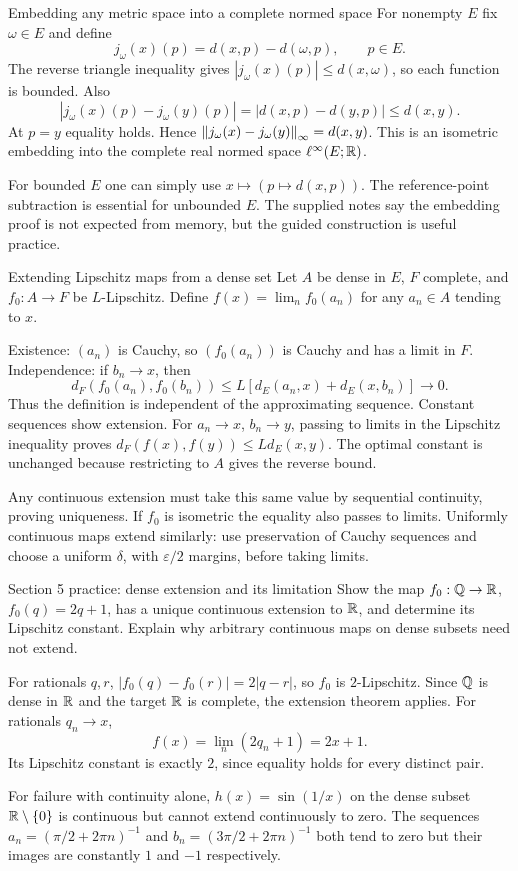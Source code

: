 \begin{note}{Embedding any metric space into a complete normed space}
For nonempty $E$ fix $\omega\in E$ and define
\[j_\omega(x)(p)=d(x,p)-d(\omega,p),\qquad p\in E.\]
The reverse triangle inequality gives $|j_\omega(x)(p)|\le d(x,\omega)$, so each function is bounded. Also
\[|j_\omega(x)(p)-j_\omega(y)(p)|=|d(x,p)-d(y,p)|\le d(x,y).\]
At $p=y$ equality holds. Hence $\left\lVert j_\omega(x)-j_\omega(y)\right\rVert_\infty=d(x,y)$. This is an isometric embedding into the complete real normed space $\ell^\infty(E;\mathbb R)$.

For bounded $E$ one can simply use $x\mapsto(p\mapsto d(x,p))$. The reference-point subtraction is essential for unbounded $E$. The supplied notes say the embedding proof is not expected from memory, but the guided construction is useful practice.
\end{note}
\begin{note}{Extending Lipschitz maps from a dense set}
Let $A$ be dense in $E$, $F$ complete, and $f_0:A\to F$ be $L$-Lipschitz. Define $f(x)=\lim_n f_0(a_n)$ for any $a_n\in A$ tending to $x$.

Existence: $(a_n)$ is Cauchy, so $(f_0(a_n))$ is Cauchy and has a limit in $F$. Independence: if $b_n\to x$, then
\[d_F(f_0(a_n),f_0(b_n))\le L[d_E(a_n,x)+d_E(x,b_n)]\to0.\]
Thus the definition is independent of the approximating sequence. Constant sequences show extension. For $a_n\to x$, $b_n\to y$, passing to limits in the Lipschitz inequality proves $d_F(f(x),f(y))\le Ld_E(x,y)$. The optimal constant is unchanged because restricting to $A$ gives the reverse bound.

Any continuous extension must take this same value by sequential continuity, proving uniqueness. If $f_0$ is isometric the equality also passes to limits. Uniformly continuous maps extend similarly: use preservation of Cauchy sequences and choose a uniform $\delta$, with $\varepsilon/2$ margins, before taking limits.
\end{note}
\begin{exam}{Section 5 practice: dense extension and its limitation}
Show the map $f_0:\mathbb Q\to\mathbb R$, $f_0(q)=2q+1$, has a unique continuous extension to $\mathbb R$, and determine its Lipschitz constant. Explain why arbitrary continuous maps on dense subsets need not extend.
\end{exam}
\begin{answer}
For rationals $q,r$, $|f_0(q)-f_0(r)|=2|q-r|$, so $f_0$ is $2$-Lipschitz. Since $\mathbb Q$ is dense in $\mathbb R$ and the target $\mathbb R$ is complete, the extension theorem applies. For rationals $q_n\to x$,
\[f(x)=\lim_n(2q_n+1)=2x+1.\]
Its Lipschitz constant is exactly $2$, since equality holds for every distinct pair.

For failure with continuity alone, $h(x)=\sin(1/x)$ on the dense subset $\mathbb R\setminus\{0\}$ is continuous but cannot extend continuously to zero. The sequences $a_n=(\pi/2+2\pi n)^{-1}$ and $b_n=(3\pi/2+2\pi n)^{-1}$ both tend to zero but their images are constantly $1$ and $-1$ respectively.
\end{answer}
